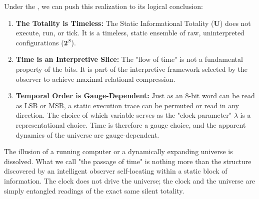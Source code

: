 Under the , we can push this realization to its logical conclusion:

\begin{enumerate}
\item \textbf{The Totality is Timeless:} The Static Informational Totality ($\mathbf{U}$) does not execute, run, or tick.
  It is a timeless, static ensemble of raw, uninterpreted configurations ($\mathbf{2}^S$). 
\item \textbf{Time is an Interpretive Slice:} The "flow of time" is not a fundamental property of the bits.
  It is part of the interpretive framework selected by the observer to achieve maximal relational compression.
\item \textbf{Temporal Order is Gauge-Dependent:} Just as an 8-bit word can be read as LSB or MSB, a static execution trace can be permuted or read in any direction.
  The choice of which variable serves as the "clock parameter" $\lambda$ is a representational choice.
  Time is therefore a gauge choice, and the apparent dynamics of the universe are gauge-dependent.
\end{enumerate}

The illusion of a running computer or a dynamically expanding universe is dissolved.
What we call "the passage of time" is nothing more than the structure discovered by an intelligent observer self-locating within a static block of information.
The clock does not drive the universe; the clock and the universe are simply entangled readings of the exact same silent totality.
